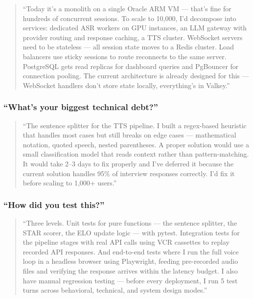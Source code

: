 \documentclass[
  11pt,
]{article}
\begin{document}
\begin{quote}
``Today it's a monolith on a single Oracle ARM VM --- that's fine for
hundreds of concurrent sessions. To scale to 10,000, I'd decompose into
services: dedicated ASR workers on GPU instances, an LLM gateway with
provider routing and response caching, a TTS cluster. WebSocket servers
need to be stateless --- all session state moves to a Redis cluster.
Load balancers use sticky sessions to route reconnects to the same
server. PostgreSQL gets read replicas for dashboard queries and
PgBouncer for connection pooling. The current architecture is already
designed for this --- WebSocket handlers don't store state locally,
everything's in Valkey.''
\end{quote}

\hypertarget{whats-your-biggest-technical-debt}{%
\subsubsection{``What's your biggest technical
debt?''}\label{whats-your-biggest-technical-debt}}

\begin{quote}
``The sentence splitter for the TTS pipeline. I built a regex-based
heuristic that handles most cases but still breaks on edge cases ---
mathematical notation, quoted speech, nested parentheses. A proper
solution would use a small classification model that reads context
rather than pattern-matching. It would take 2--3 days to fix properly
and I've deferred it because the current solution handles 95\% of
interview responses correctly. I'd fix it before scaling to 1,000+
users.''
\end{quote}

\hypertarget{how-did-you-test-this}{%
\subsubsection{``How did you test this?''}\label{how-did-you-test-this}}

\begin{quote}
``Three levels. Unit tests for pure functions --- the sentence splitter,
the STAR scorer, the ELO update logic --- with pytest. Integration tests
for the pipeline stages with real API calls using VCR cassettes to
replay recorded API responses. And end-to-end tests where I run the full
voice loop in a headless browser using Playwright, feeding pre-recorded
audio files and verifying the response arrives within the latency
budget. I also have manual regression testing --- before every
deployment, I run 5 test turns across behavioral, technical, and system
design modes.''
\end{quote}
\end{document}

